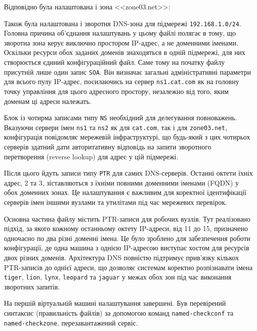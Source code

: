 \documentclass[14pt, a4paper]{extreport}
\begin{document}
	Відповідно була налаштована і зона <<zone03.net>>:
	
	
	Також була налаштована і зворотня DNS-зона для підмережі \texttt{192.168.1.0/24}. Головна причина об'єднання налаштувань у цьому файлі полягає в тому, що зворотна зона керує виключно простором IP-адрес, а не доменними іменами. Оскільки ресурси обох заданих доменів знаходяться в одній підмережі, для них створюється єдиний конфігураційний файл.  Саме тому на початку файлу присутній лише один запис \texttt{SOA}. Він визначає загальні адміністративні параметри для всього пулу IP-адрес, посилаючись на сервер \texttt{ns1.cat.com} як на головну точку управління для цього адресного простору, незалежно від того, яким доменам ці адреси належать.
	
	Блок із чотирма записами типу \texttt{NS} необхідний для делегування повноважень. Вказуючи сервери імен \texttt{ns1} та \texttt{ns2} як для \texttt{cat.com}, так і для \texttt{zone03.net}, конфігурація повідомляє мережевій інфраструктурі, що будь-який з цих чотирьох серверів здатний дати авторитативну відповідь на запити зворотного перетворення (reverse lookup) для адрес у цій підмережі.
	
	Після цього йдуть записи типу \texttt{PTR} для самих DNS-серверів. Останні октети їхніх адрес, 2 та 3, зіставляються з їхніми повними доменними іменами (FQDN) у обох доменних зонах. Це налаштування є важливим для коректної ідентифікації серверів імен іншими вузлами та утилітами під час мережевих перевірок.
	
	Основна частина файлу містить PTR-записи для робочих вузлів. Тут реалізовано підхід, за якого кожному останньому октету IP-адреси, від 11 до 15, призначено одночасно по два різні доменні імена. Це було зроблено для забезпечення роботи конфігурації, де одна машина з однією IP-адресою виступає хостом для ресурсів двох різних доменів. Архітектура DNS повністю підтримує прив'язку кількох PTR-записів до однієї адреси, що дозволяє системам коректно розпізнавати імена \texttt{tiger}, \texttt{lion}, \texttt{lynx}, \texttt{leopard} та \texttt{jaguar} у межах обох зон під час виконання зворотних запитів.
	
	
	На першій віртуальній машині налаштування завершені. Був перевірений синтаксис (правильність файлів) за допомогою команд \texttt{named-checkconf} та \texttt{named-checkzone}, перезавантажений сервіс.
	
	
\end{document}
